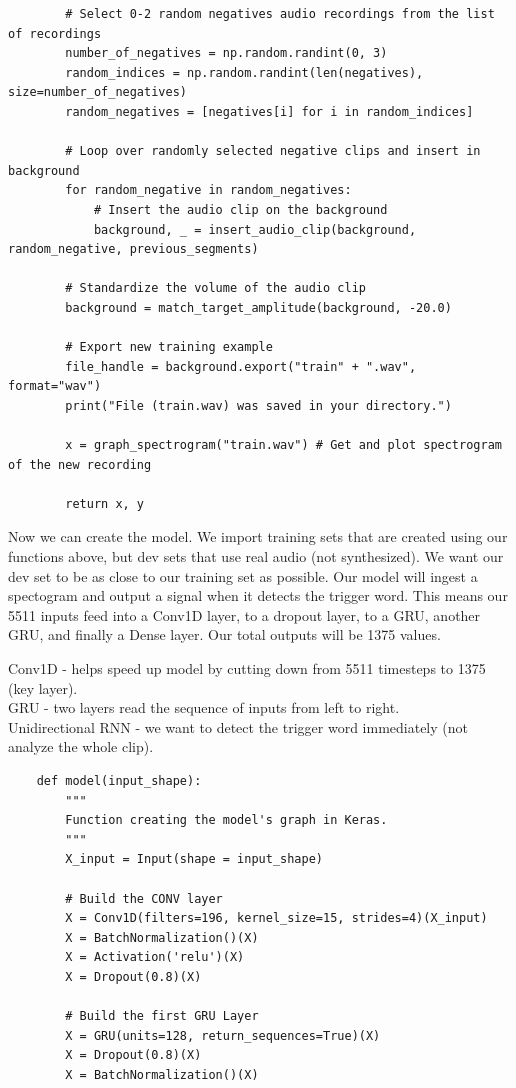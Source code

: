 \documentclass[11pt, a4paper]{article}
\begin{document}
\begin{spacing}{1.1}
\begin{lstlisting}
		# Select 0-2 random negatives audio recordings from the list of recordings
		number_of_negatives = np.random.randint(0, 3)
		random_indices = np.random.randint(len(negatives), size=number_of_negatives)
		random_negatives = [negatives[i] for i in random_indices]
		
		# Loop over randomly selected negative clips and insert in background
		for random_negative in random_negatives:
			# Insert the audio clip on the background 
			background, _ = insert_audio_clip(background, random_negative, previous_segments)
		
		# Standardize the volume of the audio clip 
		background = match_target_amplitude(background, -20.0)
		
		# Export new training example 
		file_handle = background.export("train" + ".wav", format="wav")
		print("File (train.wav) was saved in your directory.")
	
		x = graph_spectrogram("train.wav") # Get and plot spectrogram of the new recording
		
		return x, y	\end{lstlisting} \vspace*{1mm}
	Now we can create the model. We import training sets that are created using our functions above, but dev sets that use real audio (not synthesized). We want our dev set to be as close to our training set as possible. Our model will ingest a spectogram and output a signal when it detects the trigger word. This means our 5511 inputs feed into a Conv1D layer, to a dropout layer, to a GRU, another GRU, and finally a Dense layer. Our total outputs will be 1375 values. \newpage

	\noindent Conv1D - helps speed up model by cutting down from 5511 timesteps to 1375 (key layer). \\
	GRU - two layers read the sequence of inputs from left to right. \\
	Unidirectional RNN - we want to detect the trigger word immediately (not analyze the whole clip).
	\begin{lstlisting}
	def model(input_shape):
		"""
		Function creating the model's graph in Keras.
		"""
		X_input = Input(shape = input_shape)
		
		# Build the CONV layer
		X = Conv1D(filters=196, kernel_size=15, strides=4)(X_input)
		X = BatchNormalization()(X)                            
		X = Activation('relu')(X)                                  
		X = Dropout(0.8)(X)  
		
		# Build the first GRU Layer
		X = GRU(units=128, return_sequences=True)(X)
		X = Dropout(0.8)(X)
		X = BatchNormalization()(X)
		

\end{lstlisting}
\end{spacing}
\end{document}
